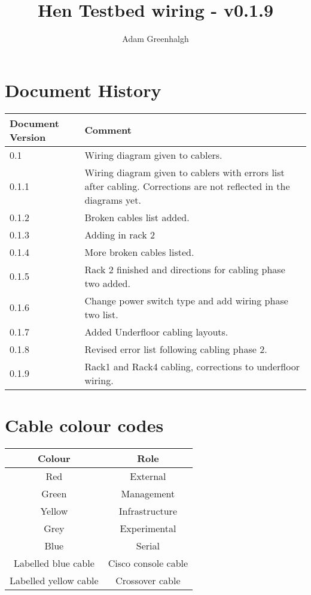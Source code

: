 \documentclass[a4paper]{article}
\begin{document}
\title{Hen Testbed wiring - v0.1.9}
\author{Adam Greenhalgh}
\maketitle
\newpage
\tableofcontents
\newpage
\section{Document History}
\begin{tabular}{|l|l|}
\hline
Document Version & Comment \\
\hline
0.1 & Wiring diagram given to cablers. \\
0.1.1 & Wiring diagram given to cablers with errors list after cabling. Corrections are not reflected in the diagrams yet. \\ 
0.1.2 & Broken cables list added.\\
0.1.3 & Adding in rack 2\\
0.1.4 & More broken cables listed.\\
0.1.5 & Rack 2 finished and directions for cabling phase two added.\\
0.1.6 & Change power switch type and add wiring phase two list.\\
0.1.7 & Added Underfloor cabling layouts.\\
0.1.8 & Revised error list following cabling phase 2.\\
0.1.9 & Rack1 and Rack4 cabling, corrections to underfloor wiring.\\
\hline
\end{tabular}

\section{Cable colour codes}

\begin{center}
\begin{tabular}{|c|c|}
\hline
Colour & Role \\
\hline
Red & External \\
Green & Management \\
Yellow & Infrastructure \\
Grey & Experimental \\
Blue & Serial \\
Labelled blue cable & Cisco console cable \\
Labelled yellow cable & Crossover cable \\ 
\hline
\end{tabular}
\end{center}
\end{document}
